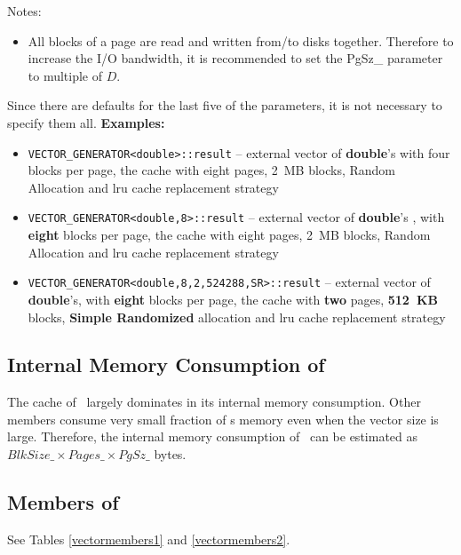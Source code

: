 \documentclass[twoside]{book}
\begin{document}
Notes:
\begin{itemize}
\item All blocks of a page are read and written from/to
disks together. Therefore to increase the I/O bandwidth, it is
recommended to set the PgSz\_ parameter to multiple of $D$.
\end{itemize}

Since there are defaults for the last five
of the parameters, it is not necessary to specify them all.
{\bf Examples:}
\begin{itemize}
\item \texttt{VECTOR\_GENERATOR<double>::result} -- external vector of
{\bf double}'s with four blocks per page, the cache with eight pages, 2~MB
blocks, Random  Allocation and lru cache replacement strategy 
\item \texttt{VECTOR\_GENERATOR<double,8>::result} -- external vector
of {\bf double}'s , with {\bf eight} blocks per page, the cache with eight pages, 2~MB
blocks, Random  Allocation and lru cache replacement strategy 
\item \texttt{VECTOR\_GENERATOR<double,8,2,524288,SR>::result} --
external vector of {\bf double}'s, with {\bf eight} blocks per page, the cache
with {\bf two} pages, {\bf 512~KB} 
blocks, {\bf Simple Randomized} allocation and lru cache replacement strategy 
\end{itemize}

\subsection{Internal Memory Consumption of \xvector}
The cache of \xvector\ largely dominates in its internal memory
consumption. Other members consume very small fraction of \xvector s
memory even when the vector size is large. Therefore, the internal
memory consumption of \xvector\ can be estimated as
$BlkSize\_ \times Pages\_ \times PgSz\_$ bytes.



\subsection{Members of \xvector}
See Tables \ref{vectormembers1} and  \ref{vectormembers2}.
\end{document}
